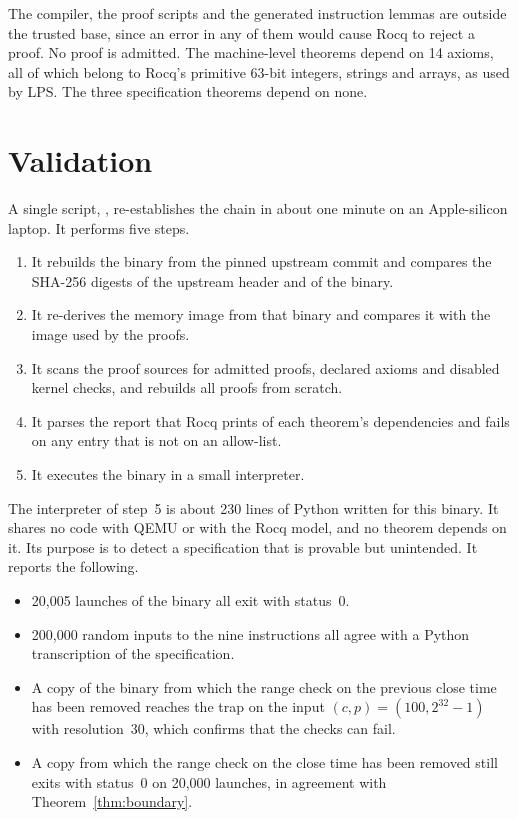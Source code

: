 \documentclass[11pt,a4paper]{article}
\newcommand{\code}[1]{\texttt{\upshape\detokenize{#1}}}
\newcommand{\W}{2^{32}}
\theoremstyle{definition}
\begin{document}
The compiler, the proof scripts and the generated instruction lemmas are
outside the trusted base, since an error in any of them would cause Rocq to
reject a proof. No proof is admitted. The machine-level theorems depend on
14 axioms, all of which belong to Rocq's primitive 63-bit integers, strings
and arrays, as used by LPS. The three specification theorems depend on none.

\section{Validation}
\label{sec:checks}

A single script, \code{tools/check.sh}, re-establishes the chain in about
one minute on an Apple-silicon laptop. It performs five steps.

\begin{enumerate}
\item It rebuilds the binary from the pinned upstream commit and compares
  the SHA-256 digests of the upstream header and of the binary.
\item It re-derives the memory image from that binary and compares it with
  the image used by the proofs.
\item It scans the proof sources for admitted proofs, declared axioms and
  disabled kernel checks, and rebuilds all proofs from scratch.
\item It parses the report that Rocq prints of each theorem's dependencies
  and fails on any entry that is not on an allow-list.
\item It executes the binary in a small interpreter.
\end{enumerate}

\noindent The interpreter of step~5 is about 230 lines of Python written for
this binary. It shares no code with QEMU or with the Rocq model, and no
theorem depends on it. Its purpose is to detect a specification that is
provable but unintended. It reports the following.

\begin{itemize}
\item 20,005 launches of the binary all exit with status~0.
\item 200,000 random inputs to the nine instructions all agree with a Python
  transcription of the specification.
\item A copy of the binary from which the range check on the previous close
  time has been removed reaches the trap on the input
  $(c, p) = (100, \W - 1)$ with resolution~30, which confirms that the
  checks can fail.
\item A copy from which the range check on the close time has been removed
  still exits with status~0 on 20,000 launches, in agreement with
  Theorem~\ref{thm:boundary}.
\end{itemize}
\end{document}

